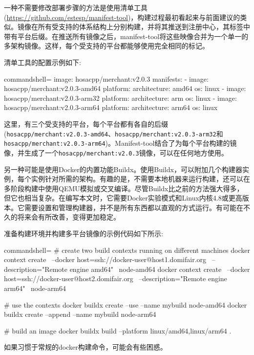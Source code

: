 一种不需要修改部署步骤的方法是使用清单工具(\url{https://github.com/estesp/manifest-tool})，构建过程最初看起来与前面建议的类似。镜像在所有受支持的体系结构上分别构建，并将其推送到注册中心，其标签中带有平台后缀。在推送所有镜像之后，manifest-tool将这些映像合并为一个单一的多架构镜像。这样，每个受支持的平台都能够使用完全相同的标记。

清单工具的配置示例如下:

\begin{tcblisting}{commandshell={}}
image: hosacpp/merchant:v2.0.3
manifests:
  - image: hosacpp/merchant:v2.0.3-amd64
    platform:
      architecture: amd64
      os: linux
  - image: hosacpp/merchant:v2.0.3-arm32
    platform:
      architecture: arm
      os: linux
  - image: hosacpp/merchant:v2.0.3-arm64
    platform:
      architecture: arm64
      os: linux
\end{tcblisting}

这里，有三个受支持的平台，每个平台都有各自的后缀(\texttt{hosacpp/merchant:v2.0.3-amd64}、\texttt{hosacpp/merchant:v2.0.3-arm32}和\texttt{hosacpp/merchant:v2.0.3-arm64})。Manifest-tool结合了为每个平台构建的镜像，并生成了一个\texttt{hosacpp/merchant:v2.0.3}镜像，可以在任何地方使用。

另一种可能是使用Docker的内置功能Buildx。使用Buildx，可以附加几个构建器实例，每个实例针对所需的架构。有趣的是，不需要本地机器来运行构建，还可以在多阶段构建中使用QEMU模拟或交叉编译。尽管Buildx比之前的方法强大得多，但它也相当复杂。在编写本文时，它需要Docker实验模式和Linux内核4.8或更高版本。它需要设置和管理构建器，并不是所有东西都以直观的方式运行。有可能在不久的将来会有所改善，变得更加稳定。

准备构建环境并构建多平台镜像的示例代码如下所示:

\begin{tcblisting}{commandshell={}}
# create two build contexts running on different machines
docker context create \
    --docker host=ssh://docker-user@host1.domifair.org \
    --description="Remote engine amd64" \
    node-amd64
docker context create \
    --docker host=ssh://docker-user@host2.domifair.org \
    --description="Remote engine arm64" \
    node-arm64

# use the contexts
docker buildx create --use --name mybuild node-amd64
docker buildx create --append --name mybuild node-arm64

# build an image
docker buildx build --platform linux/amd64,linux/arm64 .
\end{tcblisting}

如果习惯于常规的docker构建命令，可能会有些困惑。

